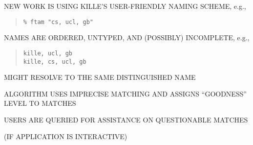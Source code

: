 \begin{bwslide}

\begin{nrtc}
\item	NEW WORK IS USING KILLE'S USER-FRIENDLY NAMING SCHEME, e.g.,
\begin{quote}\small\begin{verbatim}
% ftam "cs, ucl, gb"
\end{verbatim}\end{quote}

\item	NAMES ARE ORDERED, UNTYPED, AND (POSSIBLY) INCOMPLETE, e.g.,
\begin{quote}\small\begin{verbatim}
kille, ucl, gb
kille, cs, ucl, gb
\end{verbatim}\end{quote}
	MIGHT RESOLVE TO THE SAME DISTINGUISHED NAME

\item	ALGORITHM USES IMPRECISE MATCHING AND ASSIGNS ``GOODNESS'' LEVEL TO
	MATCHES

\item	USERS ARE QUERIED FOR ASSISTANCE ON QUESTIONABLE MATCHES
    \begin{nrtc}
    \item	(IF APPLICATION IS INTERACTIVE)
    \end{nrtc}
\end{nrtc}
\end{bwslide}


